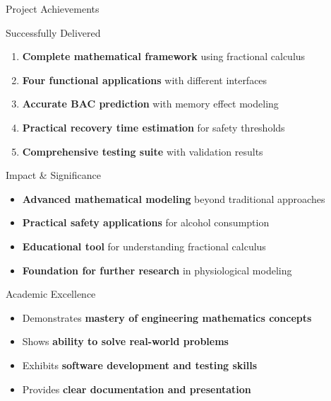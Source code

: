 \documentclass[aspectratio=169]{beamer}
\newcommand{\highlight}[1]{\textcolor{kentech_orange}{\textbf{#1}}}
\begin{document}
\begin{frame}{Project Achievements}
    \begin{block}{Successfully Delivered}
        \begin{enumerate}
            \item \highlight{Complete mathematical framework} using fractional calculus
            \item \highlight{Four functional applications} with different interfaces
            \item \highlight{Accurate BAC prediction} with memory effect modeling
            \item \highlight{Practical recovery time estimation} for safety thresholds
            \item \highlight{Comprehensive testing suite} with validation results
        \end{enumerate}
    \end{block}
    
    \begin{block}{Impact \& Significance}
        \begin{itemize}
            \item \highlight{Advanced mathematical modeling} beyond traditional approaches
            \item \highlight{Practical safety applications} for alcohol consumption
            \item \highlight{Educational tool} for understanding fractional calculus
            \item \highlight{Foundation for further research} in physiological modeling
        \end{itemize}
    \end{block}
    
    \begin{block}{Academic Excellence}
        \begin{itemize}
            \item Demonstrates \highlight{mastery of engineering mathematics concepts}
            \item Shows \highlight{ability to solve real-world problems}
            \item Exhibits \highlight{software development and testing skills}
            \item Provides \highlight{clear documentation and presentation}
        \end{itemize}
    \end{block}
\end{frame}
\end{document}
